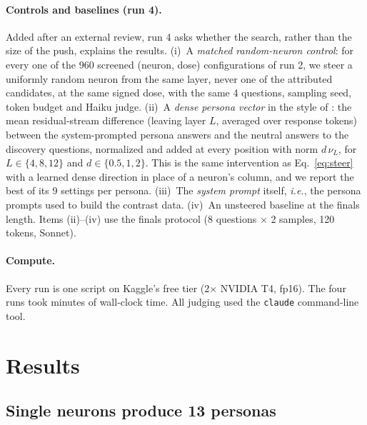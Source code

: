 \documentclass[11pt]{article}
\newcommand{\dose}{d}
\begin{document}
\paragraph{Controls and baselines (run 4).} Added after an external review, run 4 asks whether the search, rather than the size of the push, explains the results. (i)~A \emph{matched random-neuron control}: for every one of the 960 screened (neuron, dose) configurations of run 2, we steer a uniformly random neuron from the same layer, never one of the attributed candidates, at the same signed dose, with the same 4 questions, sampling seed, token budget and Haiku judge. (ii)~A \emph{dense persona vector} in the style of \citet{chen2025persona}: the mean residual-stream difference (leaving layer $L$, averaged over response tokens) between the system-prompted persona answers and the neutral answers to the discovery questions, normalized and added at every position with norm $\dose\,\nu_L$, for $L\in\{4,8,12\}$ and $\dose\in\{0.5,1,2\}$. This is the same intervention as Eq.~\eqref{eq:steer} with a learned dense direction in place of a neuron's column, and we report the best of its 9 settings per persona. (iii)~The \emph{system prompt} itself, \emph{i.e.}, the persona prompts used to build the contrast data. (iv)~An unsteered baseline at the finals length. Items (ii)--(iv) use the finals protocol (8 questions $\times$ 2 samples, 120 tokens, Sonnet).

\paragraph{Compute.} Every run is one script on Kaggle's free tier (2$\times$ NVIDIA T4, fp16). The four runs took \gpuMinutes{} minutes of wall-clock time. All judging used the \texttt{claude} command-line tool.

\section{Results}
\label{sec:results}

\subsection{Single neurons produce 13 personas}
\end{document}
